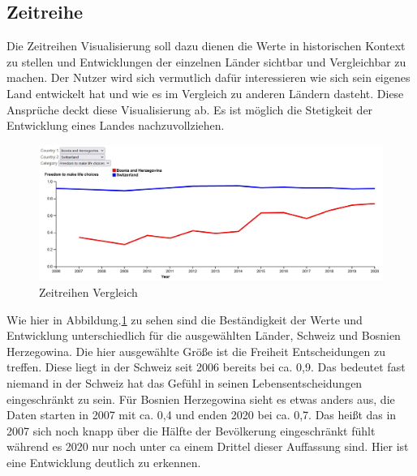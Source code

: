 \subsection{Zeitreihe}

Die Zeitreihen Visualisierung soll dazu dienen die Werte in historischen Kontext zu stellen und Entwicklungen der einzelnen Länder sichtbar und Vergleichbar zu machen. Der Nutzer wird sich vermutlich dafür interessieren wie sich sein eigenes Land entwickelt hat und wie es im Vergleich zu anderen Ländern dasteht. Diese Ansprüche deckt diese Visualisierung ab. Es ist möglich die Stetigkeit der Entwicklung eines Landes nachzuvollziehen.\\

\begin{figure}[h]
 \centering
 \includegraphics[width = \textwidth]{img/timeseries_anw.jpg}
 \caption{Zeitreihen Vergleich}
 \label{fig:time_anw}
\end{figure}

Wie hier in Abbildung.\ref{fig:time_anw} zu sehen sind die Beständigkeit der Werte und Entwicklung unterschiedlich für die ausgewählten Länder, Schweiz und Bosnien Herzegowina. Die hier ausgewählte Größe ist die Freiheit Entscheidungen zu treffen. Diese liegt in der Schweiz seit 2006 bereits bei ca. 0,9. Das bedeutet fast niemand in der Schweiz hat das Gefühl in seinen Lebensentscheidungen eingeschränkt zu sein. Für Bosnien Herzegowina sieht es etwas anders aus, die Daten starten in 2007 mit ca. 0,4 und enden 2020 bei ca. 0,7. Das heißt das in 2007 sich noch knapp über die Hälfte der Bevölkerung eingeschränkt fühlt während es 2020 nur noch unter ca einem Drittel dieser Auffassung sind. Hier ist eine Entwicklung deutlich zu erkennen. 